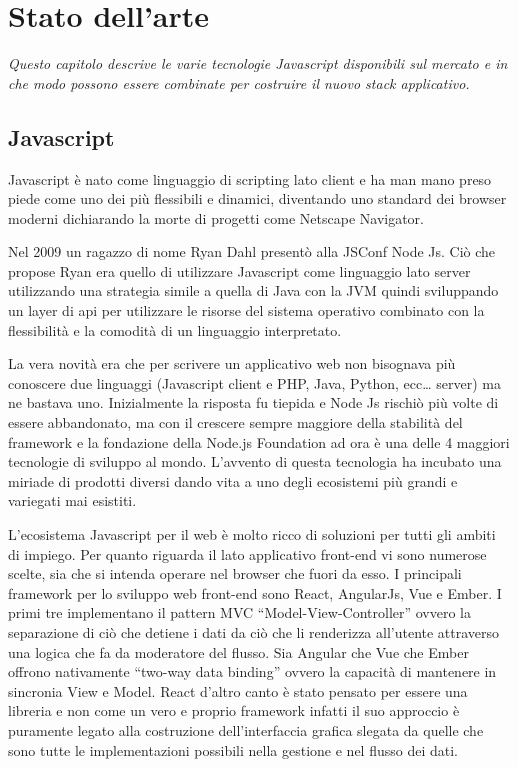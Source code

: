 \chapter{Stato dell'arte}
\label{cha:intro}
\vspace{5mm}
\emph{Questo capitolo descrive le varie tecnologie Javascript disponibili sul mercato e in che modo possono essere combinate per costruire il nuovo stack applicativo.}
\section{Javascript}\vspace{5mm}
Javascript è nato come linguaggio di scripting lato client e ha man mano preso piede come uno dei più flessibili e dinamici, diventando uno standard dei browser moderni dichiarando la morte di progetti come Netscape Navigator.\vspace{5mm}

Nel 2009 un ragazzo di nome Ryan Dahl presentò alla JSConf Node Js. Ciò che propose Ryan era quello di utilizzare Javascript come linguaggio lato server utilizzando una strategia simile a quella di Java con la JVM quindi sviluppando un layer di api per utilizzare le risorse del sistema operativo combinato con la flessibilità e la comodità di un linguaggio interpretato.\vspace{5mm}

La vera novità era che per scrivere un applicativo web non bisognava più conoscere due linguaggi (Javascript client e PHP, Java, Python, ecc… server) ma ne bastava uno. Inizialmente la risposta fu tiepida e Node Js rischiò più volte di essere abbandonato, ma con il crescere sempre maggiore della stabilità del framework e la fondazione della Node.js Foundation ad ora è una delle 4 maggiori tecnologie di sviluppo al mondo. L’avvento di questa tecnologia ha incubato una miriade di prodotti diversi dando vita a uno degli ecosistemi più grandi e variegati mai esistiti.\vspace{5mm}

	L’ecosistema Javascript per il web è molto ricco di soluzioni per tutti gli ambiti di impiego. Per quanto riguarda il lato applicativo front-end vi sono numerose scelte, sia che si intenda operare nel browser che fuori da esso. I principali framework per lo sviluppo web front-end sono React, AngularJs, Vue e Ember. I primi tre implementano il pattern MVC “Model-View-Controller” ovvero la separazione di ciò che detiene i dati da ciò che li renderizza all’utente attraverso una logica che fa da moderatore del flusso. Sia Angular che Vue che Ember offrono nativamente “two-way data binding” ovvero la capacità di mantenere in sincronia View e Model. React d’altro canto è stato pensato per essere una libreria e non come un vero e proprio framework infatti il suo approccio è puramente legato alla costruzione dell’interfaccia grafica slegata da quelle che sono tutte le implementazioni possibili nella gestione e nel flusso dei dati. \vspace{5mm}

